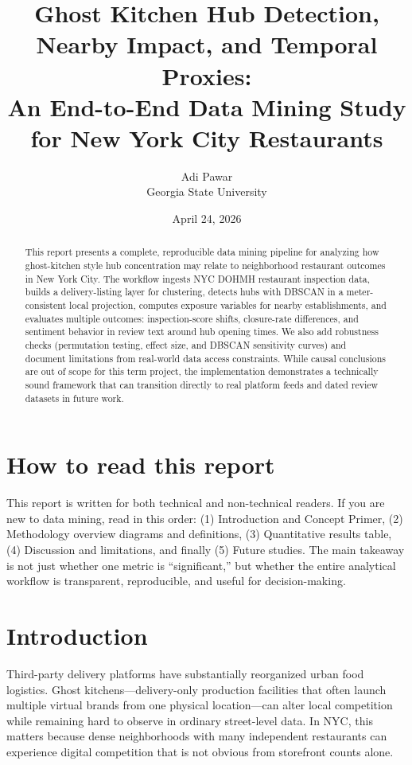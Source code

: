 \documentclass[10pt,twocolumn]{article}
\title{Ghost Kitchen Hub Detection, Nearby Impact, and Temporal Proxies:\\
An End-to-End Data Mining Study for New York City Restaurants}
\author{Adi Pawar\\Georgia State University\\[4pt]\underline{\hspace{1.6in}}}
\date{April 24, 2026}
\begin{document}
\maketitle

\begin{abstract}
This report presents a complete, reproducible data mining pipeline for analyzing how ghost-kitchen style hub concentration may relate to neighborhood restaurant outcomes in New York City. The workflow ingests NYC DOHMH restaurant inspection data, builds a delivery-listing layer for clustering, detects hubs with DBSCAN in a meter-consistent local projection, computes exposure variables for nearby establishments, and evaluates multiple outcomes: inspection-score shifts, closure-rate differences, and sentiment behavior in review text around hub opening times. We also add robustness checks (permutation testing, effect size, and DBSCAN sensitivity curves) and document limitations from real-world data access constraints. While causal conclusions are out of scope for this term project, the implementation demonstrates a technically sound framework that can transition directly to real platform feeds and dated review datasets in future work.
\end{abstract}

\section*{How to read this report}
This report is written for both technical and non-technical readers. If you are new to data mining, read in this order: (1) Introduction and Concept Primer, (2) Methodology overview diagrams and definitions, (3) Quantitative results table, (4) Discussion and limitations, and finally (5) Future studies. The main takeaway is not just whether one metric is ``significant,'' but whether the entire analytical workflow is transparent, reproducible, and useful for decision-making.

\section{Introduction}
Third-party delivery platforms have substantially reorganized urban food logistics. Ghost kitchens---delivery-only production facilities that often launch multiple virtual brands from one physical location---can alter local competition while remaining hard to observe in ordinary street-level data. In NYC, this matters because dense neighborhoods with many independent restaurants can experience digital competition that is not obvious from storefront counts alone.
\end{document}
